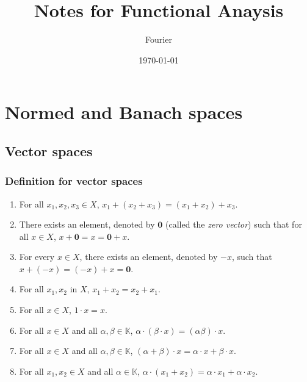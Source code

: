 \documentclass[
	border={25mm 20mm 25mm 30mm},  %
	varwidth,  %
	utf8,
]{standalone}
\title{Notes for Functional Anaysis}
\author{Fourier}
\date{\today}
\newenvironment{myindentpar}[1]%
	{\begin{list}{}%
			{\setlength{\leftmargin}{#1}}%
			\item[]%
	}
 {\end{list}}
\begin{document}
\maketitle

\tableofcontents

\setlength{\parindent}{1em}  %

\section{Normed and Banach spaces}

\subsection{Vector spaces}

\subsubsection{Definition for vector spaces}

\begin{myindentpar}{1em}
	\begin{enumerate}[(1)]
		\item For all \( x_1, x_2, x_3 \in X \), \( x_1 + \left( x_2 + x_3 \right) = \left( x_1 + x_2 \right) + x_3 \).
		\item There exists an element, denoted by \( \bm{0} \) (called the \textit{zero vector}) such that for all \( x \in X \), \( x + \bm{0} = x = \bm{0} + x \).
		\item For every \( x \in X \), there exists an element, denoted by \( -x \), such that \( x + \left( -x \right) = \left(-x\right) + x = \bm{0} \).
		\item For all \( x_1, x_2 \) in \( X \), \( x_1 + x_2 = x_2 + x_1 \).
		\item For all \( x \in X \), \( 1 \cdot x = x \).
		\item For all \( x \in X \) and all \( \alpha, \beta \in \mathbb{K} \), \( \alpha \cdot \left(\beta \cdot x\right) = \left(\alpha \beta\right)\cdot x \).
		\item For all \( x \in X \) and all \( \alpha, \beta \in \mathbb{K} \), \( \left(\alpha + \beta\right) \cdot x = \alpha \cdot x + \beta \cdot x \).
		\item For all \( x_1, x_2 \in X \) and all \( \alpha \in \mathbb{K} \), \( \alpha \cdot \left(x_1 + x_2\right) = \alpha \cdot x_1 + \alpha \cdot x_2 \).
	\end{enumerate}
\end{myindentpar}
\end{document}
